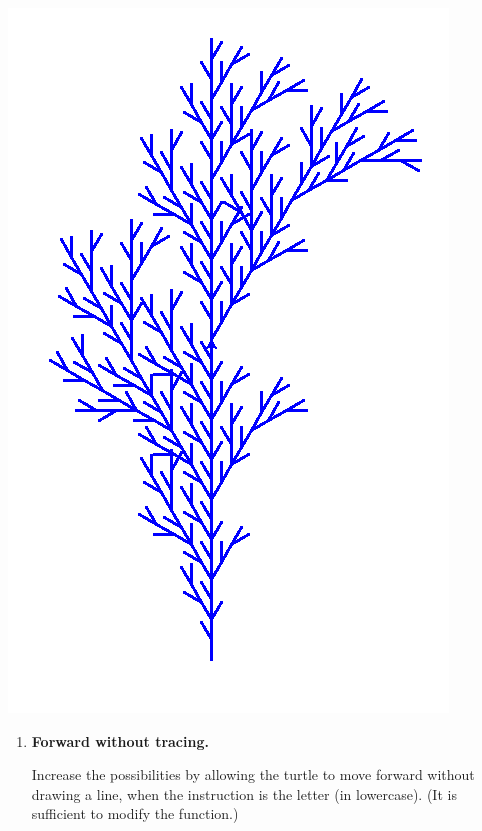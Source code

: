 \documentclass[11pt,class=report,crop=false]{standalone}
\begin{document}
\begin{activite}


\begin{center}
\includegraphics[scale=\myscale,scale=0.27]{screen-lsystems-17}
\end{center}

\begin{enumerate}
  \item \textbf{Forward without tracing.} 
  
  Increase the possibilities by allowing the turtle to move forward without drawing a line, when the instruction is the letter  (in lowercase). (It is sufficient to modify the 
  function.)


\end{enumerate}
\end{activite}
\end{document}
